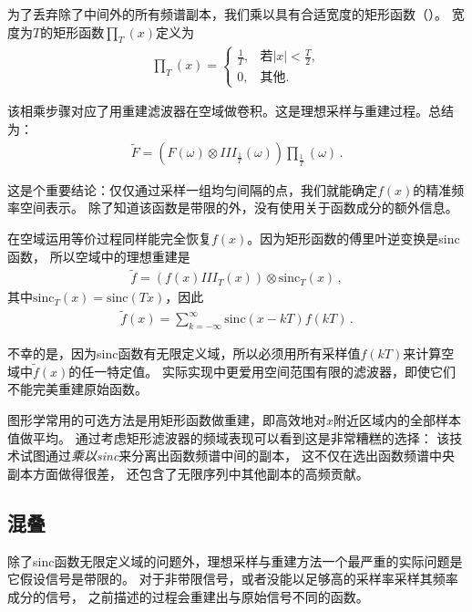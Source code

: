 为了丢弃除了中间外的所有频谱副本，我们乘以具有合适宽度的矩形函数（）。
宽度为$T$的矩形函数$\textstyle\prod_T(x)$定义为
\begin{align*}
    {\textstyle\prod_T}(x)=\left\{\begin{array}{ll}
        \displaystyle\frac{1}{T}, & \text{若}\displaystyle|x|<\frac{T}{2}, \\
        0,                        & \text{其他}.
    \end{array}\right.
\end{align*}

该相乘步骤对应了用重建滤波器在空域做卷积。这是理想采样与重建过程。总结为：
\begin{align*}
    \tilde{F}=(F(\omega)\otimes III_{\frac{1}{T}}(\omega))\textstyle\prod_{\frac{1}{T}}(\omega)\, .
\end{align*}

这是个重要结论：仅仅通过采样一组均匀间隔的点，我们就能确定$f(x)$的精准频率空间表示。
除了知道该函数是带限的外，没有使用关于函数成分的额外信息。

在空域运用等价过程同样能完全恢复$f(x)$。因为矩形函数的傅里叶逆变换是sinc函数，
所以空域中的理想重建是
\begin{align*}
    \tilde{f}=(f(x)III_T(x))\otimes \mathrm{sinc}_T(x)\, ,
\end{align*}
其中$\mathrm{sinc}_T(x)=\mathrm{sinc}(Tx)$，因此
\begin{align*}
    \tilde{f}(x)=\sum\limits_{k=-\infty}^{\infty}\mathrm{sinc}(x-kT)f(kT)\, .
\end{align*}

不幸的是，因为sinc函数有无限定义域，所以必须用所有采样值$f(kT)$来计算空域中$\tilde{f}(x)$的任一特定值。
实际实现中更爱用空间范围有限的滤波器，即使它们不能完美重建原始函数。

图形学常用的可选方法是用矩形函数做重建，即高效地对$x$附近区域内的全部样本值做平均。
通过考虑矩形滤波器的频域表现可以看到这是非常糟糕的选择：
该技术试图通过\emph{乘以sinc}来分离出函数频谱中间的副本，
这不仅在选出函数频谱中央副本方面做得很差，
还包含了无限序列中其他副本的高频贡献。

\subsection{混叠}\label{sub:混叠}
除了sinc函数无限定义域的问题外，理想采样与重建方法一个最严重的实际问题是它假设信号是带限的。
对于非带限信号，或者没能以足够高的采样率采样其频率成分的信号，
之前描述的过程会重建出与原始信号不同的函数。

